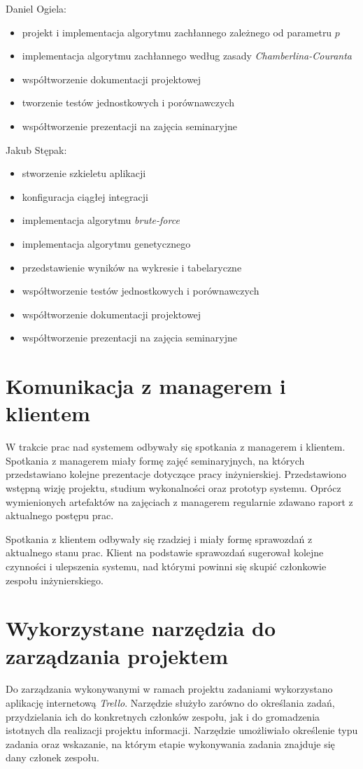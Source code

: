 \documentclass[pdflatex,11pt]{../aghdoc_version2}
\begin{document}
Daniel Ogiela:
\begin{itemize}
\item projekt i implementacja algorytmu zachłannego zależnego od parametru $p$
\item implementacja algorytmu zachłannego według zasady \textit{Chamberlina-Couranta}
\item współtworzenie dokumentacji projektowej
\item tworzenie testów jednostkowych i porównawczych
\item współtworzenie prezentacji na zajęcia seminaryjne
\end{itemize}

Jakub Stępak:
\begin{itemize}
\item stworzenie szkieletu aplikacji
\item konfiguracja ciągłej integracji
\item implementacja algorytmu \textit{brute-force}
\item implementacja algorytmu genetycznego
\item przedstawienie wyników na wykresie i tabelaryczne
\item współtworzenie testów jednostkowych i porównawczych
\item współtworzenie dokumentacji projektowej
\item współtworzenie prezentacji na zajęcia seminaryjne
\end{itemize}

\section{Komunikacja z managerem i klientem}
W trakcie prac nad systemem odbywały się spotkania z managerem i klientem. Spotkania z
managerem miały formę zajęć seminaryjnych, na których przedstawiano kolejne prezentacje
dotyczące pracy inżynierskiej. Przedstawiono wstępną wizję projektu, studium wykonalności
oraz prototyp systemu. Oprócz wymienionych artefaktów na zajęciach z managerem
regularnie zdawano raport z aktualnego postępu prac.

Spotkania z klientem odbywały się rzadziej i miały formę sprawozdań z aktualnego stanu
prac. Klient na podstawie sprawozdań sugerował kolejne czynności i ulepszenia systemu,
nad którymi powinni się skupić członkowie zespołu inżynierskiego.

\section{Wykorzystane narzędzia do zarządzania projektem}
Do zarządzania wykonywanymi w ramach projektu zadaniami wykorzystano aplikację
internetową \textit{Trello}. Narzędzie służyło zarówno do określania zadań, przydzielania ich do
konkretnych członków zespołu, jak i do gromadzenia istotnych dla realizacji projektu
informacji. Narzędzie umożliwiało określenie typu zadania oraz wskazanie, na którym etapie
wykonywania zadania znajduje się dany członek zespołu.
\end{document}
